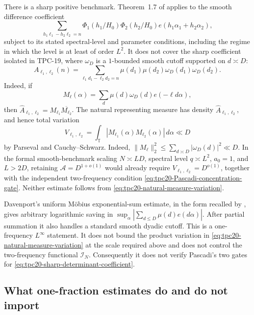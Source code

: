 There is a sharp positive benchmark.  Theorem~1.7 of
\citet{Pascadi2026LargeSieve} applies to the smooth difference
coefficient
\[
 \sum_{h_1\ell_1-h_2\ell_2=n}
 \Phi_1(h_1/H_0)\Phi_2(h_2/H_0)
 e(h_1\alpha_1+h_2\alpha_2),
\]
subject to its stated spectral-level and parameter conditions, including
the regime in which the level is at least of order \(L^2\).  It does not
cover the sharp coefficient isolated in TPC-19, where \(\omega_D\) is a
\(1\)-bounded smooth cutoff supported on \(d\asymp D\):
\begin{equation}
 A_{\ell_1,\ell_2}(n)
 =\sum_{\ell_1d_1-\ell_2d_2=n}
 \mu(d_1)\mu(d_2)\omega_D(d_1)\omega_D(d_2).
 \label{eq:tpc20-sharp-determinant-coefficient}
\end{equation}
Indeed, if
\[
 M_\ell(\alpha)
 =\sum_d\mu(d)\omega_D(d)e(-\ell d\alpha),
\]
then
\(\widehat A_{\ell_1,\ell_2}
 =M_{\ell_1}\overline{M_{\ell_2}}\).  The natural representing measure
has density \(\widehat A_{\ell_1,\ell_2}\), and hence total variation
\begin{equation}
 V_{\ell_1,\ell_2}
 =\int_{\mathbb T}|M_{\ell_1}(\alpha)M_{\ell_2}(\alpha)|\,d\alpha
 \ll D
 \label{eq:tpc20-natural-measure-variation}
\end{equation}
by Parseval and Cauchy--Schwarz.  Indeed,
\(\lVert M_\ell\rVert_2^2\le\sum_{d\asymp D}|\omega_D(d)|^2\ll D\).
In the formal smooth-benchmark scaling
\(N\asymp LD\), spectral level \(q\asymp L^2\), \(a_0=1\), and
\(L>2D\), retaining \(\mathcal A=D^{1+o(1)}\) would already require
\(V_{\ell_1,\ell_2}=D^{o(1)}\), together with the independent
two-frequency condition
\eqref{eq:tpc20-Pascadi-concentration-gate}.  Neither estimate follows
from \eqref{eq:tpc20-natural-measure-variation}.

Davenport's uniform M\"obius exponential-sum estimate, in the form
recalled by \citet{GreenTao2008}, gives arbitrary logarithmic saving in
\(\sup_\alpha|\sum_{d\leq D}\mu(d)e(d\alpha)|\).  After partial
summation it also handles a standard smooth dyadic cutoff.  This is a
one-frequency \(L^\infty\) statement.  It does not bound the product
variation in \eqref{eq:tpc20-natural-measure-variation} at the scale
required above and does not control the two-frequency functional
\(\mathcal I_N\).  Consequently it does not verify Pascadi's two gates
for \eqref{eq:tpc20-sharp-determinant-coefficient}.

\subsection{What one-fraction estimates do and do not import}

